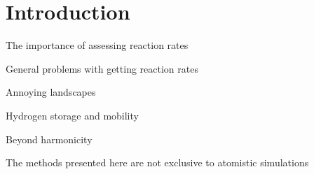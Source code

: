 \chapter{Introduction}
\label{chap:introduction}

\bit
\item The importance of assessing reaction rates
\item General problems with getting reaction rates
\item Annoying landscapes
\item Hydrogen storage and mobility
\item Beyond harmonicity
\item The methods presented here are not exclusive to atomistic simulations
\eit

\placeholder
